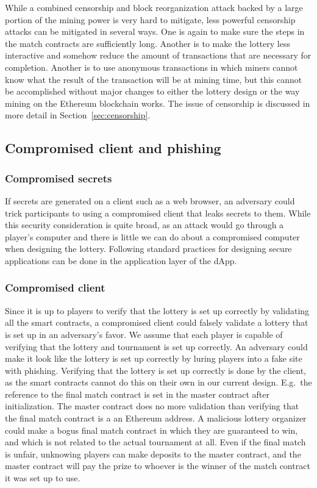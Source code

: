 While a combined censorship and block reorganization attack backed by a large portion of the mining power is very hard to mitigate, less powerful censorship attacks can be mitigated in several ways. One is again to make sure the steps in the match contracts are sufficiently long. Another is to make the lottery less interactive and somehow reduce the amount of transactions that are necessary for completion. Another is to use anonymous transactions in which miners cannot know what the result of the transaction will be at mining time, but this cannot be accomplished without major changes to either the lottery design or the way mining on the Ethereum blockchain works. The issue of censorship is discussed in more detail in Section~\ref{sec:censorship}.

\subsection{Compromised client and phishing}

\subsubsection{Compromised secrets}
If secrets are generated on a client such as a web browser, an adversary could trick participants to using a compromised client that leaks secrets to them. While this security consideration is quite broad, as an attack would go through a player's computer and there is little we can do about a compromised computer when designing the lottery. Following standard practices for designing secure applications can be done in the application layer of the dApp.

\subsubsection{Compromised client}
Since it is up to players to verify that the lottery is set up correctly by validating all the smart contracts, a compromised client could falsely validate a lottery that is set up in an adversary's favor. We assume that each player is capable of verifying that the lottery and tournament is set up correctly. An adversary could make it look like the lottery is set up correctly by luring players into a fake site with phishing. Verifying that the lottery is set up correctly is done by the client, as the smart contracts cannot do this on their own in our current design. E.g.~the reference to the final match contract is set in the master contract after initialization. The master contract does no more validation than verifying that the final match contract is a an Ethereum address. A malicious lottery organizer could make a bogus final match contract in which they are guaranteed to win, and which is not related to the actual tournament at all. Even if the final match is unfair, unknowing players can make deposits to the master contract, and the master contract will pay the prize to whoever is the winner of the match contract it was set up to use.
